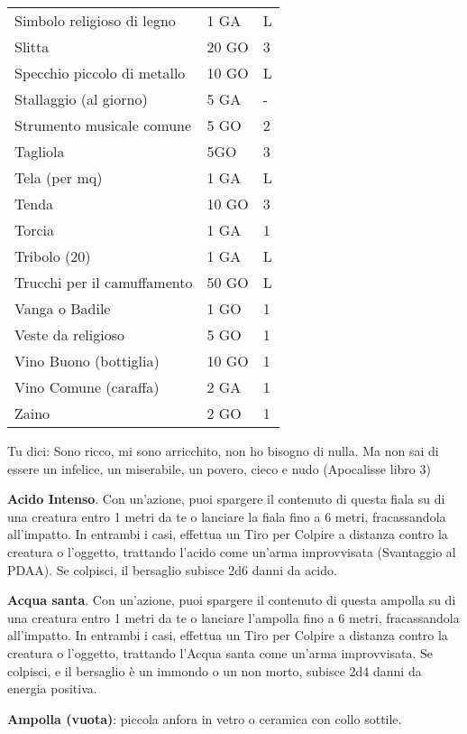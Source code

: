 \documentclass[12pt,a4paper,twoside,openany]{book}
\begin{document}
\begin{multicols}{2}
{\begin{tabularx}{0.42\textwidth}{lll}
Simbolo religioso di legno  & 1 GA& L\\
Slitta& 20 GO  & 3 \\
Specchio piccolo di metallo & 10 GO  & L\\
Stallaggio (al giorno)  & 5 GA& -\\
Strumento musicale comune& 5 GO& 2\\
Tagliola& 5GO&3\\
Tela (per mq)& 1 GA& L \\
Tenda & 10 GO  & 3 \\
Torcia& 1 GA& 1\\
Tribolo (20) & 1 GA& L \\
Trucchi per il camuffamento & 50 GO& L\\
Vanga o Badile & 1 GO&1\\
Veste da religioso & 5 GO& 1\\
Vino Buono (bottiglia) & 10 GO& 1\\
Vino Comune (caraffa)  & 2 GA& 1\\
Zaino & 2 GO& 1 \\
\end{tabularx}}


\begin{changemargin}{0.3cm}{0.3cm}\begin{enfasi}{
Tu dici: Sono ricco, mi sono arricchito, non ho bisogno di nulla. Ma non sai di essere un infelice, un miserabile, un povero, cieco e nudo (Apocalisse libro 3)
}\end{enfasi}\end{changemargin}

\textbf{Acido Intenso}. Con un’azione, puoi spargere il contenuto di questa fiala su di una creatura entro 1 metri da te o lanciare la fiala fino a 6 metri, fracassandola all’impatto. In entrambi i casi, effettua un Tiro per Colpire a distanza contro la creatura o l’oggetto, trattando l’acido come un’arma improvvisata (Svantaggio al PDAA). Se colpisci, il bersaglio subisce 2d6 danni da acido.

\textbf{Acqua santa}. Con un’azione, puoi spargere il contenuto di questa ampolla su di una creatura entro 1 metri da te o lanciare l’ampolla fino a 6 metri, fracassandola all’impatto. In entrambi i casi, effettua un Tiro per Colpire a distanza contro la creatura o l’oggetto, trattando l’Acqua santa come un’arma improvvisata. Se colpisci, e il bersaglio è un immondo o un non morto, subisce 2d4 danni da energia positiva.

\textbf{Ampolla (vuota)}: piccola anfora in vetro o ceramica con collo sottile.


\end{multicols}
\end{document}
